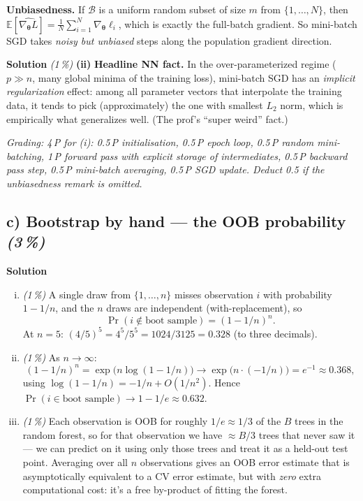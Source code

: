 \documentclass[11pt,a4paper]{article}
\newcommand{\subpoints}[1]{\textit{(#1\,\%)}}
\newcommand{\sol}{\noindent\textbf{Solution}}
\begin{document}
\textbf{Unbiasedness.} If $\mathcal B$ is a uniform random subset of size $m$ from
$\{1,\dots,N\}$, then
$\mathbb E[\widehat{\nabla_{\bm\theta} L}] = \frac{1}{N}\sum_{i=1}^N \nabla_{\bm\theta}\ell_i$,
which is exactly the full-batch gradient. So mini-batch SGD takes \emph{noisy but unbiased} steps
along the population gradient direction.

\medskip
\sol{} \subpoints{1} \textbf{(ii)} \textbf{Headline NN fact.} In the over-parameterized regime
($p \gg n$, many global minima of the training loss), mini-batch SGD has an \emph{implicit
regularization} effect: among all parameter vectors that interpolate the training data, it tends
to pick (approximately) the one with smallest $L_2$ norm, which is empirically what generalizes
well. (The prof's ``super weird'' fact.)

\noindent\emph{Grading: 4\,P for (i): 0.5\,P initialisation, 0.5\,P epoch loop, 0.5\,P random
mini-batching, 1\,P forward pass with explicit storage of intermediates, 0.5\,P backward pass step,
0.5\,P mini-batch averaging, 0.5\,P SGD update. Deduct 0.5 if the unbiasedness remark is omitted.}

\subsection*{c) Bootstrap by hand --- the OOB probability \subpoints{3}}

\sol{}
\begin{enumerate}[(i)]
  \item \subpoints{1} A single draw from $\{1,\dots,n\}$ misses observation $i$ with probability
        $1 - 1/n$, and the $n$ draws are independent (with-replacement), so
        $$\Pr(i \notin \text{boot sample}) = (1 - 1/n)^n.$$
        At $n=5$: $(4/5)^5 = 4^5/5^5 = 1024/3125 = \boxed{0.328}$ (to three decimals).
  \item \subpoints{1} As $n \to \infty$:
        $$(1 - 1/n)^n = \exp\bigl(n\log(1 - 1/n)\bigr) \to \exp\bigl(n\cdot(-1/n)\bigr) = e^{-1} \approx 0.368,$$
        using $\log(1 - 1/n) = -1/n + O(1/n^2)$. Hence
        $\Pr(i\in\text{boot sample}) \to 1 - 1/e \approx \boxed{0.632}$.
  \item \subpoints{1} Each observation is OOB for roughly $1/e \approx 1/3$ of the $B$ trees in
        the random forest, so for that observation we have $\approx B/3$ trees that never saw it
        --- we can predict on it using only those trees and treat it as a held-out test point.
        Averaging over all $n$ observations gives an OOB error estimate that is asymptotically
        equivalent to a CV error estimate, but with \emph{zero} extra computational cost: it's a
        free by-product of fitting the forest.
\end{enumerate}
\end{document}
